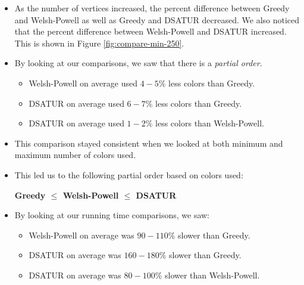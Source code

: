 \documentclass[final]{beamer}
\newlength{\onecolwid}
\begin{document}
\begin{frame}[t]
\begin{columns}[t]
\begin{column}{\onecolwid}
    \begin{itemize}
      \setlength\itemsep{0.4em}
      \rmfamily
      \item As the number of vertices increased, the percent difference between Greedy and Welsh-Powell as well as Greedy and DSATUR decreased. We also noticed that the percent difference between Welsh-Powell and DSATUR increased. This is shown in Figure \ref{fig:compare-min-250}.
      \item By looking at our comparisons, we saw that there is a \emph{partial order}.
      \begin{itemize}
        \item Welsh-Powell on average used $4-5\%$ less colors than Greedy.
        \item DSATUR on average used $6-7\%$ less colors than Greedy.
        \item DSATUR on average used $1-2\%$ less colors than Welsh-Powell.
      \end{itemize}
      \item This comparison stayed consistent when we looked at both minimum and maximum number of colors used.
      \item This led us to the following partial order based on colors used:
      \vspace{0.1cm}
      \begin{center}
        \textbf{Greedy $\leq$ Welsh-Powell $\leq$ DSATUR}
      \end{center}
      \item By looking at our running time comparisons, we saw:
      \begin{itemize}
        \item Welsh-Powell on average was $90-110\%$ slower than Greedy.
        \item DSATUR on average was $160-180\%$ slower than Greedy.
        \item DSATUR on average was $80-100\%$ slower than Welsh-Powell.
      \end{itemize}
    \end{itemize}


\end{column}
\end{columns}
\end{frame}
\end{document}
